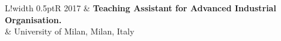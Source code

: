 \documentclass[11pt]{article}
\newcommand\VRule{\color{lightgray}\vrule width 0.5pt}
\begin{document}
\begin{flushleft}
\begin{tabular}{L!{\VRule}R}
        {\small 2017}      & {\bf Teaching Assistant for Advanced Industrial Organisation.}          \\
                           & University of Milan, Milan, Italy                                       \\
    \end{tabular}
\end{flushleft}

% 
% 
% 
% 
% 
\end{document}
